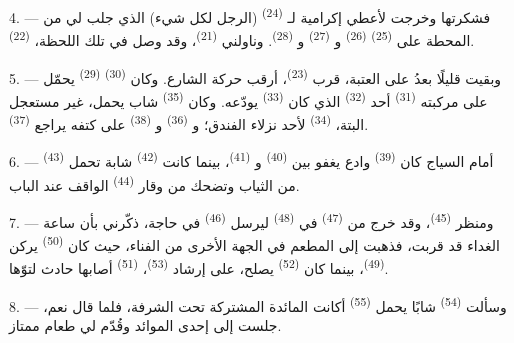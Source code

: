 4. --- فشكرتها وخرجت لأعطي إكرامية لـ \textsuperscript{(24)}
(الرجل لكل شيء) الذي جلب لي من المحطة على 
\textsuperscript{(25)}  \textsuperscript{(26)}
و \textsuperscript{(27)} و \textsuperscript{(28)}. وناولني
 \textsuperscript{(21)}، وقد وصل في تلك اللحظة،
 \textsuperscript{(22)}.

5. --- وبقيت قليلًا بعدُ على العتبة، قرب 
\textsuperscript{(23)}، أرقب حركة الشارع. وكان  \textsuperscript{(30)}
 \textsuperscript{(29)} يحمّل على مركبته 
\textsuperscript{(31)} أحد  \textsuperscript{(32)} الذي كان  \textsuperscript{(33)} يودّعه. وكان  \textsuperscript{(35)} شاب
يحمل، غير مستعجل البتة،  \textsuperscript{(34)} لأحد نزلاء الفندق؛
و \textsuperscript{(36)} و \textsuperscript{(38)} على
كتفه يراجع  \textsuperscript{(37)}.

\VUsaut{4.0mm}
\VUsaut{3.0mm}

6. --- أمام السياج كان  \textsuperscript{(39)} وادع يغفو بين
 \textsuperscript{(40)} و
\textsuperscript{(41)}، بينما كانت  \textsuperscript{(42)} شابة تحمل
 \textsuperscript{(43)} من الثياب وتضحك من وقار 
\textsuperscript{(44)} الواقف عند الباب.

7. --- ومنظر  \textsuperscript{(45)}، وقد خرج من 
\textsuperscript{(47)} في  \textsuperscript{(48)} ليرسل  \textsuperscript{(46)} في حاجة، ذكّرني بأن ساعة الغداء قد قربت، فذهبت إلى
المطعم في الجهة الأخرى من الفناء، حيث كان 
\textsuperscript{(50)} يركن  \textsuperscript{(49)}، بينما كان
 \textsuperscript{(52)} يصلح، على إرشاد 
\textsuperscript{(53)}،  \textsuperscript{(51)} أصابها حادث
لتوّها.

8. --- وسألت  \textsuperscript{(54)} شابًا يحمل 
\textsuperscript{(55)} أكانت المائدة المشتركة تحت الشرفة، فلما قال نعم، جلست
إلى إحدى الموائد وقُدّم لي طعام ممتاز.



